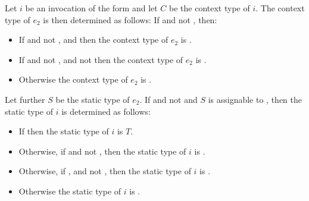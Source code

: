 \documentclass[makeidx]{article}
\begin{document}
{\LMHash{}%
Let $i$ be an invocation of the form 
and let $C$ be the context type of $i$.
The context type of $e_2$ is then determined as follows:
If  and not , then:
\begin{itemize}
  \item{} If  and not ,
      and 
      then the context type of $e_2$ is .
  \item{} If  and not ,
      and not 
     then the context type of $e_2$ is .
  \item{} Otherwise the context type of $e_2$ is .
\end{itemize}
Let further $S$ be the static type of $e_2$.
If  and not 
and $S$ is assignable to ,
then the static type of $i$ is determined as follows:
\begin{itemize}
  \item{} If 
    then the static type of $i$ is $T$.
  \item{} Otherwise, if 
    and not ,
    then the static type of $i$ is .
  \item{} Otherwise, if ,
     and not ,
    then the static type of $i$ is .
  \item{} Otherwise the static type of $i$ is .
\end{itemize}

}
\end{document}
